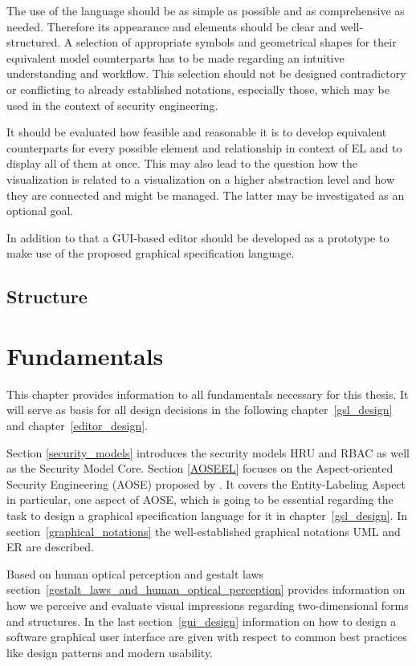 \documentclass[twoside, openright, 12pt]{book}
\begin{document}
The use of the language should be as simple as possible and as comprehensive as needed.
Therefore its appearance and elements should be clear and well-structured.
A selection of appropriate symbols and geometrical shapes for their equivalent model counterparts has to be made regarding an intuitive understanding and workflow.
This selection should not be designed contradictory or conflicting to already established notations, especially those, which may be used in the context of security engineering.

It should be evaluated how feasible and reasonable it is to develop equivalent counterparts for every possible element and relationship in context of EL and to display all of them at once.
This may also lead to the question how the visualization is related to a visualization on a higher abstraction level and how they are connected and might be managed.
The latter may be investigated as an optional goal.

In addition to that a GUI-based editor should be developed as a prototype to make use of the proposed graphical specification language.



\section{Structure}
\label{structure}




\cleardoublepage
\chapter{Fundamentals}
\label{fundamentals}
This chapter provides information to all fundamentals necessary for this thesis.
It will serve as basis for all design decisions in the following chapter~\ref{gsl_design} and chapter~\ref{editor_design}.

Section \ref{security_models} introduces the security models HRU and RBAC as well as the Security Model Core.
Section \ref{AOSEEL} focuses on the Aspect-oriented Security Engineering (AOSE) proposed by \citet*{Amthor18}.
It covers the Entity-Labeling Aspect in particular, one aspect of AOSE, which is going to be essential regarding the task to design a graphical specification language for it in chapter~\ref{gsl_design}.
In section~\ref{graphical_notations} the well-established graphical notations UML and ER are described.

Based on human optical perception and gestalt laws section~\ref{gestalt_laws_and_human_optical_perception} provides information on how we perceive and evaluate visual impressions regarding two-dimensional forms and structures.
In the last section~\ref{gui_design} information on how to design a software graphical user interface are given with respect to common best practices like design patterns and modern usability.
\end{document}

